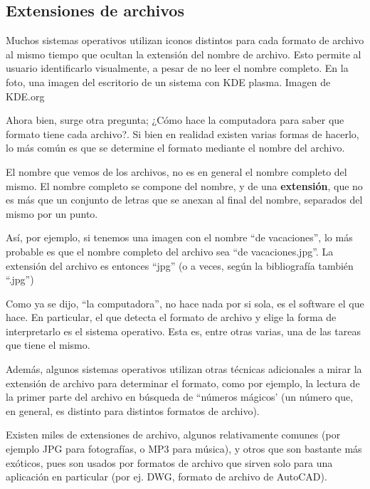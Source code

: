 \subsection{Extensiones de archivos}
\label{chap:informatica:subsec:extensiones}

{Muchos sistemas operativos utilizan iconos distintos para cada formato de
archivo al mismo tiempo que ocultan la extensión del nombre de archivo. Esto
permite al usuario identificarlo visualmente, a pesar de no leer el nombre
completo. En la foto, una imagen del escritorio de un sistema con KDE plasma.}
{Imagen de KDE.org}

Ahora bien, surge otra pregunta; ¿Cómo hace la computadora para saber que
formato tiene cada archivo?. Si bien en realidad existen varias formas de
hacerlo, lo más común es que se determine el formato mediante el nombre del
archivo.

El nombre que vemos de los archivos, no es en general el nombre completo del
mismo. El nombre completo se compone del nombre, y de una \textbf{extensión},
que no es más que un conjunto de letras que se anexan al final del nombre,
separados del mismo por un punto.\autocite{linfo_2018}

Así, por ejemplo, si tenemos una imagen con el nombre ``de vacaciones'', lo más
probable es que el nombre completo del archivo sea ``de vacaciones.jpg''. La
extensión del archivo es entonces ``jpg'' (o a veces, según la bibliografía
también ``.jpg'')

\begin{knowwhat}[En realidad]
Como ya se dijo, ``la computadora'', no hace nada por si sola, es el software el
que hace. En particular, el que detecta el formato de archivo y elige la forma
de interpretarlo es el sistema operativo. Esta es, entre otras varias, una de
las tareas que tiene el mismo.

Además, algunos sistemas operativos utilizan otras técnicas adicionales a mirar
la extensión de archivo para determinar el formato, como por ejemplo, la lectura
de la primer parte del archivo en búsqueda de ``números mágicos' (un número que,
en general, es distinto para distintos formatos de archivo).
\end{knowwhat}

Existen miles de extensiones de archivo, algunos relativamente comunes (por
ejemplo JPG para fotografías, o MP3 para música), y otros que son bastante más
exóticos, pues son usados por formatos de archivo que sirven solo para una
aplicación en particular (por ej. DWG, formato de archivo de AutoCAD).

